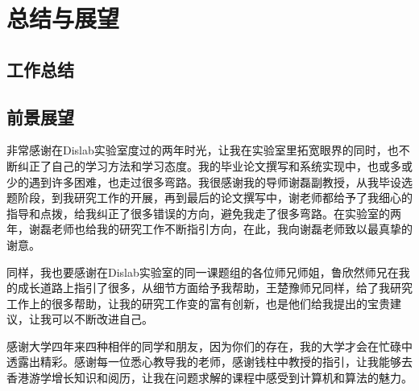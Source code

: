 \documentclass[winfonts]{njuthesis}
\begin{document}
\chapter{总结与展望}
	\section{工作总结}
	\section{前景展望}

	\begin{acknowledgement}
		非常感谢在Dislab实验室度过的两年时光，让我在实验室里拓宽眼界的同时，也不断纠正了自己的学习方法和学习态度。我的毕业论文撰写和系统实现中，也或多或少的遇到许多困难，也走过很多弯路。我很感谢我的导师谢磊副教授，从我毕设选题阶段，到我研究工作的开展，再到最后的论文撰写中，谢老师都给予了我细心的指导和点拨，给我纠正了很多错误的方向，避免我走了很多弯路。在实验室的两年，谢磊老师也给我的研究工作不断指引方向，在此，我向谢磊老师致以最真挚的谢意。
		
		同样，我也要感谢在Dislab实验室的同一课题组的各位师兄师姐，鲁欣然师兄在我的成长道路上指引了很多，从细节方面给予我帮助，王楚豫师兄同样，给了我研究工作上的很多帮助，让我的研究工作变的富有创新，也是他们给我提出的宝贵建议，让我可以不断改进自己。
		
		感谢大学四年来四种相伴的同学和朋友，因为你们的存在，我的大学才会在忙碌中透露出精彩。感谢每一位悉心教导我的老师，感谢钱柱中教授的指引，让我能够去香港游学增长知识和阅历，让我在问题求解的课程中感受到计算机和算法的魅力。
	\end{acknowledgement}
\end{document}
